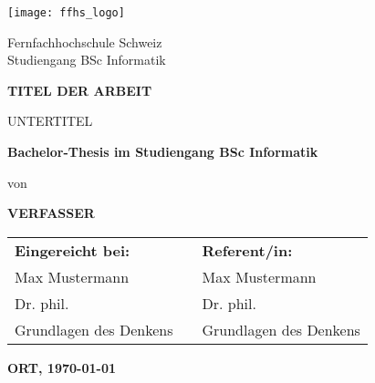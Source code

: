 \begin{titlepage}


    \begin{minipage}[t]{0.5\textwidth}\vspace{0pt}
        \texttt{[image: ffhs\_logo]}
    \end{minipage}
    \begin{minipage}[t]{0.43\textwidth}\vspace{2.3pt}
        \begin{flushright}
            Fernfachhochschule Schweiz\\
            Studiengang BSc Informatik\\
        \end{flushright}
    \end{minipage}
    \begin{center}
    
        \vfill
            
        \Huge
        \textbf{TITEL DER ARBEIT}
            
        \vspace{0.5cm}
        \LARGE
        UNTERTITEL
            
        \vfill
                        
        \textbf{Bachelor-Thesis im Studiengang BSc Informatik}
        
        \vspace{0.5cm}
        von
        \vspace{0.5cm}
                
        \textbf{VERFASSER}
            
        \vspace{2cm}
        \normalsize
               
        \begin{tabularx}{0.65\textwidth}{@{}l C l@{}} 
            \textbf{Eingereicht bei:}   & & \textbf{Referent/in:} \\ 
            Max Mustermann              & & Max Mustermann \\
            Dr. phil.                   & & Dr. phil. \\
            Grundlagen des Denkens      & & Grundlagen des Denkens \\
        \end{tabularx}
                
        \vspace{2cm}
            
            
        \textbf{ORT, \today}
        
        \vfill
    \end{center}
\end{titlepage}
